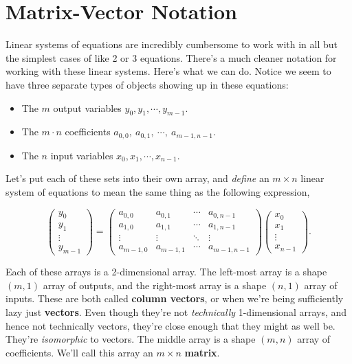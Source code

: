 \documentclass[
  letterpaper,
  DIV=11,
  numbers=noendperiod]{scrreprt}
\providecommand{\tightlist}{%
  \setlength{\itemsep}{0pt}\setlength{\parskip}{0pt}}\usepackage{longtable,booktabs,array}
\begin{document}
\hypertarget{matrix-vector-notation}{%
\section{Matrix-Vector Notation}\label{matrix-vector-notation}}

Linear systems of equations are incredibly cumbersome to work with in
all but the simplest cases of like 2 or 3 equations. There's a much
cleaner notation for working with these linear systems. Here's what we
can do. Notice we seem to have three separate types of objects showing
up in these equations:

\begin{itemize}
\tightlist
\item
  The \(m\) output variables \(y_0, y_1, \cdots, y_{m-1}\).
\item
  The \(m \cdot n\) coefficients
  \(a_{0,0}, \ a_{0,1}, \ \cdots, \ a_{m-1,n-1}\).
\item
  The \(n\) input variables \(x_0, x_1, \cdots, x_{n-1}\).
\end{itemize}

Let's put each of these sets into their own array, and \emph{define} an
\(m \times n\) linear system of equations to mean the same thing as the
following expression,

\[
\begin{pmatrix}
y_0 \\ y_1 \\ \vdots \\ y_{m-1}
\end{pmatrix} = 
\begin{pmatrix}
a_{0,0} & a_{0,1} & \cdots & a_{0,n-1} \\
a_{1,0} & a_{1,1} & \cdots & a_{1,n-1} \\
\vdots  & \vdots  & \ddots & \vdots    \\
a_{m-1,0} & a_{m-1,1} & \cdots & a_{m-1,n-1}
\end{pmatrix}
\begin{pmatrix}
x_0 \\ x_1 \\ \vdots \\ x_{n-1}
\end{pmatrix}.
\]

Each of these arrays is a 2-dimensional array. The left-most array is a
shape \((m, 1)\) array of outputs, and the right-most array is a shape
\((n, 1)\) array of inputs. These are both called \textbf{column
vectors}, or when we're being sufficiently lazy just \textbf{vectors}.
Even though they're not \emph{technically} 1-dimensional arrays, and
hence not technically vectors, they're close enough that they might as
well be. They're \emph{isomorphic} to vectors. The middle array is a
shape \((m, n)\) array of coefficients. We'll call this array an
\(m \times n\) \textbf{matrix}.
\end{document}
